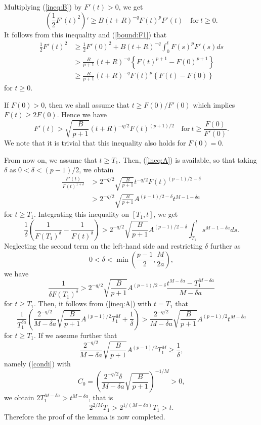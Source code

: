 \documentclass[a4paper,12pt]{article}
\numberwithin{equation}{section}
\def\d{\displaystyle}
\begin{document}
Multiplying (\ref{ineq:B}) by $F'(t)>0$, we get
\[
\left(\frac{1}{2}F'(t)^2\right)'\ge B(t+R)^{-q}F(t)^pF'(t)\quad\mbox{for}\ t\ge0.
\] 
It follows from this inequality and (\ref{bound:F1}) that
\[
\begin{array}{ll}
\d\frac{1}{2}F'(t)^2
&\d \ge\frac{1}{2}F'(0)^2+B(t+R)^{-q}\int_0^tF(s)^pF'(s)ds\\
&\d >\frac{B}{p+1}(t+R)^{-q}\left\{F(t)^{p+1}-F(0)^{p+1}\right\}\\
&\d \ge\frac{B}{p+1}(t+R)^{-q}F(t)^p\left\{F(t)-F(0)\right\}
\end{array}
\]
for $t\ge0$.
\par
If $F(0)>0$, then we shall assume that $t\ge F(0)/F'(0)$ which implies $F(t)\ge 2F(0)$.
Hence we have
\[
F'(t)>\sqrt{\frac{B}{p+1}}(t+R)^{-q/2}F(t)^{(p+1)/2}\quad\mbox{for}\ t\ge\frac{F(0)}{F'(0)}.
\]
We note that it is trivial that this inequality also holds for $F(0)=0$.
\par
From now on, we assume that $t\ge T_1$. Then, (\ref{ineq:A}) is available,
so that taking $\delta$ as $0<\delta<(p-1)/2$, we obtain
\[
\begin{array}{ll}
\d\frac{F'(t)}{F(t)^{1+\delta}}
&\d >2^{-q/2}\sqrt{\frac{B}{p+1}}t^{-q/2}F(t)^{(p-1)/2-\delta}\\
&\d >2^{-q/2}\sqrt{\frac{B}{p+1}}A^{(p-1)/2-\delta}t^{M-1-\delta a}
\end{array}
\]
for $t\ge T_1$.
Integrating this inequality on $[T_1,t]$, we get
\[
\frac{1}{\delta}\left(\frac{1}{F(T_1)^\delta}-\frac{1}{F(t)^\delta}\right)
>2^{-q/2}\sqrt{\frac{B}{p+1}}A^{(p-1)/2-\delta}\int_{T_1}^t s^{M-1-\delta a}ds.
\]
Neglecting the second term on the left-hand side
and restricting $\delta$ further as
\[
0<\delta<\min\left(\frac{p-1}{2},\frac{M}{2a}\right),
\]
we have
\[
\frac{1}{\delta F(T_1)^\delta}
>2^{-q/2}\sqrt{\frac{B}{p+1}}A^{(p-1)/2-\delta}\frac{t^{M-\delta a}-T_1^{M-\delta a}}{M-\delta a}
\]
for $t\ge T_1$.
Then, it follows from (\ref{ineq:A}) with $t=T_1$ that
\[
\frac{1}{T_1^{\delta a}}\left(\frac{2^{-q/2}}{M-\delta a}
\sqrt{\frac{B}{p+1}}A^{(p-1)/2}T_1^M+\frac{1}{\delta}\right)
>\frac{2^{-q/2}}{M-\delta a}\sqrt{\frac{B}{p+1}}A^{(p-1)/2}t^{M-\delta a}
\]
for $t\ge T_1$.
If we assume further that
\[
\frac{2^{-q/2}}{M-\delta a}
\sqrt{\frac{B}{p+1}}A^{(p-1)/2}T_1^M\ge\frac{1}{\delta},
\]
namely (\ref{condi}) with
\[
C_0=\left(\frac{2^{-q/2}\delta}{M-\delta a}\sqrt{\frac{B}{p+1}}\right)^{-1/M}>0,
\]
we obtain $2T_1^{M-\delta a}>t^{M-\delta a}$, that is
\[
2^{2/M}T_1>2^{1/(M-\delta a)}T_1>t.
\]
Therefore the proof of the lemma is now completed.
\end{document}
